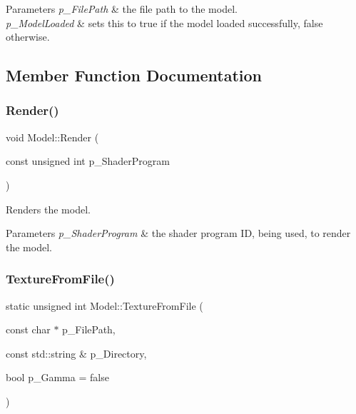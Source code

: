 \begin{DoxyParams}{Parameters}
{\em p\+\_\+\+File\+Path} & the file path to the model. \\
\hline
{\em p\+\_\+\+Model\+Loaded} & sets this to true if the model loaded successfully, false otherwise. \\
\hline
\end{DoxyParams}


\subsection{Member Function Documentation}
\mbox{\label{class_model_ab5283b9f5bbd72e86fe79f5ad9b5bd81}} 
\subsubsection{\texorpdfstring{Render()}{Render()}}
{\footnotesize\ttfamily void Model\+::\+Render (\begin{DoxyParamCaption}\item[{const unsigned int}]{p\+\_\+\+Shader\+Program }\end{DoxyParamCaption})}



Renders the model. 


\begin{DoxyParams}{Parameters}
{\em p\+\_\+\+Shader\+Program} & the shader program ID, being used, to render the model. \\
\hline
\end{DoxyParams}
\mbox{\label{class_model_af13273ddd9a34c09beba7f210bf978af}} 
\subsubsection{\texorpdfstring{TextureFromFile()}{TextureFromFile()}}
{\footnotesize\ttfamily static unsigned int Model\+::\+Texture\+From\+File (\begin{DoxyParamCaption}\item[{const char $\ast$}]{p\+\_\+\+File\+Path,  }\item[{const std\+::string \&}]{p\+\_\+\+Directory,  }\item[{bool}]{p\+\_\+\+Gamma = {\ttfamily false} }\end{DoxyParamCaption})\hspace{0.3cm}{\ttfamily [static]}}



